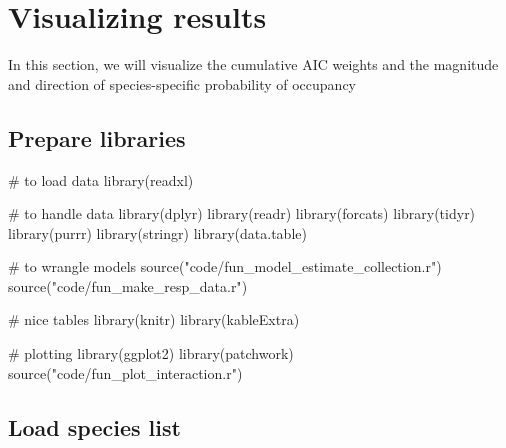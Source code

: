 \documentclass[]{article}
\newenvironment{Shaded}{}{}
\newcommand{\CommentTok}[1]{\textcolor[rgb]{0.00,0.50,0.00}{#1}}
\newcommand{\KeywordTok}[1]{\textcolor[rgb]{0.00,0.00,1.00}{#1}}
\newcommand{\NormalTok}[1]{#1}
\newcommand{\OperatorTok}[1]{#1}
\newcommand{\StringTok}[1]{\textcolor[rgb]{0.00,0.50,0.50}{#1}}
\begin{document}
\hypertarget{visualizing-results}{%
\section{Visualizing results}\label{visualizing-results}}

In this section, we will visualize the cumulative AIC weights and the magnitude and direction of species-specific probability of occupancy

\hypertarget{prepare-libraries-3}{%
\subsection{Prepare libraries}\label{prepare-libraries-3}}

\begin{Shaded}
\begin{Highlighting}[]
\CommentTok{# to load data}
\KeywordTok{library}\NormalTok{(readxl)}

\CommentTok{# to handle data}
\KeywordTok{library}\NormalTok{(dplyr)}
\KeywordTok{library}\NormalTok{(readr)}
\KeywordTok{library}\NormalTok{(forcats)}
\KeywordTok{library}\NormalTok{(tidyr)}
\KeywordTok{library}\NormalTok{(purrr)}
\KeywordTok{library}\NormalTok{(stringr)}
\KeywordTok{library}\NormalTok{(data.table)}

\CommentTok{# to wrangle models}
\KeywordTok{source}\NormalTok{(}\StringTok{"code/fun_model_estimate_collection.r"}\NormalTok{)}
\KeywordTok{source}\NormalTok{(}\StringTok{"code/fun_make_resp_data.r"}\NormalTok{)}

\CommentTok{# nice tables}
\KeywordTok{library}\NormalTok{(knitr)}
\KeywordTok{library}\NormalTok{(kableExtra)}

\CommentTok{# plotting}
\KeywordTok{library}\NormalTok{(ggplot2)}
\KeywordTok{library}\NormalTok{(patchwork)}
\KeywordTok{source}\NormalTok{(}\StringTok{"code/fun_plot_interaction.r"}\NormalTok{)}
\end{Highlighting}
\end{Shaded}

\hypertarget{load-species-list}{%
\subsection{Load species list}\label{load-species-list}}

\begin{Shaded}
\end{Shaded}
\end{document}
